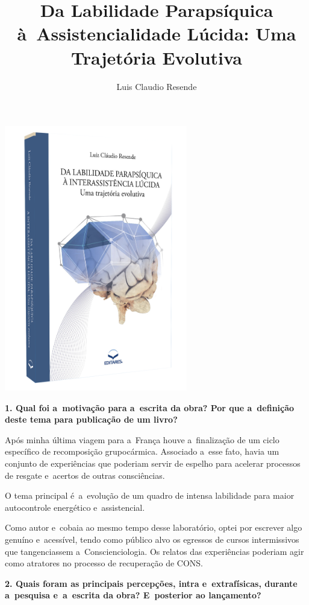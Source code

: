 \documentclass{gescons}
\author{Luis Claudio Resende}
\title{Da Labilidade Parapsíquica à~Assistencialidade Lúcida: Uma Trajetória Evolutiva}
\begin{document}
    \makeentrevistatitle

    \begin{multicols}{2}


\begin{center}
    \includegraphics[width=8cm]{articles/entrevista/mockups/Luis_Claudio_Resende-Labilidade}
\end{center}

\textbf{1. Qual foi a~motivação para a~escrita da obra? Por que a~definição deste tema para publicação de um livro? }

Após minha última viagem para a~França houve a~finalização de um ciclo específico de recomposição grupocármica.  Associado a~esse fato, havia um conjunto de experiências que poderiam servir de espelho para acelerar processos de resgate e~acertos de outras consciências.

O tema principal é~a~evolução de um quadro de intensa labilidade para maior autocontrole energético e~assistencial. 

Como autor e~cobaia ao mesmo tempo desse laboratório, optei por escrever algo genuíno e~acessível, tendo como público alvo os egressos de cursos intermissivos que tangenciassem a~Conscienciologia.  Os relatos das experiências poderiam agir como atratores no processo de recuperação de CONS.

\textbf{2.       Quais foram as principais percepções, intra e~extrafísicas, durante a~pesquisa e~a~escrita da obra? E~posterior ao lançamento?}


\end{multicols}
\end{document}
